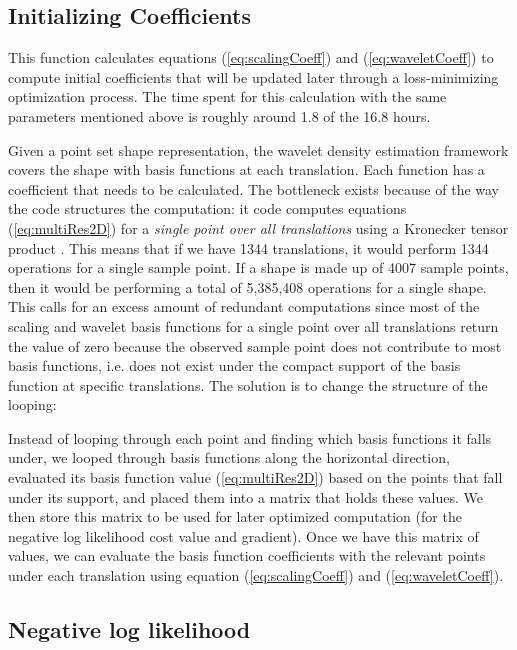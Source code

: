 \documentclass[../tech_report_1.tex]{subfiles}
\begin{document}
\subsection{Initializing Coefficients}

This function calculates equations (\ref{eq:scalingCoeff})
and (\ref{eq:waveletCoeff}) to compute initial coefficients
that will be updated later through a loss-minimizing optimization process.
The time spent for this calculation with the same parameters mentioned
above is roughly around 1.8 of the 16.8 hours. 

Given a point set shape representation, the wavelet density estimation framework covers the
shape with basis functions at each translation. Each function has
a coefficient that needs to be calculated. The bottleneck exists because of the way the code structures the computation: it
code computes equations (\ref{eq:multiRes2D}) for a \emph{single
point over all translations} using a Kronecker
tensor product \cite{van2000ubiquitous}.  
 This means that if we have 1344 translations,
it would perform 1344 operations for a single sample point. If a shape is made up of 4007 sample
points, then it would be performing a total of 5,385,408 operations
for a single shape. This calls for an excess amount of redundant computations
since most of the scaling and wavelet basis functions for a single
point over all translations return the value of zero because the observed sample point does not contribute
to most basis functions, i.e. does not exist under the compact support
of the basis function at specific translations. The solution is to change the structure of the looping: 

Instead of looping through each point and finding which basis functions
it falls under, we looped through basis functions along the horizontal
direction, evaluated its basis function value (\ref{eq:multiRes2D})
based on the points that fall under its support, and placed them into a
matrix that holds these values. We then store this matrix to be used
for later optimized computation (for the negative log likelihood cost
value and gradient). Once we have this matrix of values, we can evaluate the basis function coefficients with the relevant points
under each translation using equation (\ref{eq:scalingCoeff}) and
(\ref{eq:waveletCoeff}). 


\subsection{Negative log likelihood}
\end{document}
